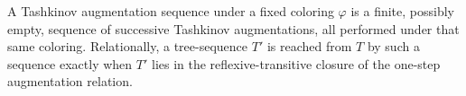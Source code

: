 \begin{definition}
A Tashkinov augmentation sequence under a fixed coloring $\varphi$ is a
finite, possibly empty, sequence of successive Tashkinov augmentations, all
performed under that same coloring.  Relationally, a tree-sequence $T'$ is
reached from $T$ by such a sequence exactly when $T'$ lies in the
reflexive-transitive closure of the one-step augmentation relation.
\end{definition}
